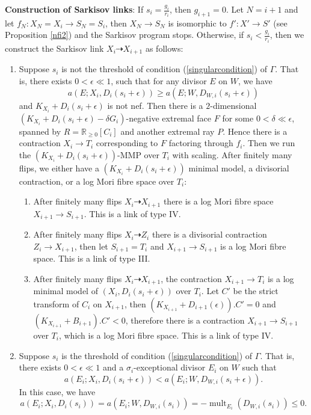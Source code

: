 \documentclass[11pt]{amsart}
\begin{document}
\textbf{Construction of Sarkisov links}\label{Construction}: If $s_{i}=\frac{g_{i}}{r_{i}}$, then $g_{i+1}=0$. Let $N=i+1$  and let $f_{N}:X_{N}=X_{i} \to S_{N}=S_{i}$, then $X_{N}\to S_{N}$ is isomorphic to $f':X'\to S'$ (see Proposition \ref{nfi2}) and  the Sarkisov program stops. Otherwise, if  $s_{i}<\frac{g_{i}}{r_{i}}$, then we construct the Sarkisov link $X_{i}\dashrightarrow X_{i+1}$ as follows:
\begin{enumerate}
  \item\label{2a} Suppose $s_{i}$ is not the threshold of  condition (\ref{singularcondition}) of $\Gamma$. That is, there exists $0<\epsilon\ll 1$, such that for any divisor $E$ on $W$, we have
    \[
      a(E;X_{i},D_{i}(s_{i}+\epsilon))\geqslant a(E;W,D_{W,i}(s_{i}+\epsilon))
    \]
    and $K_{X_{i}}+D_{i}(s_{i}+\epsilon)$ is not nef. Then there is a $2$-dimensional $(K_{X_{i}}+D_{i}(s_{i}+\epsilon)-\delta G_{i})$-negative extremal face $F$ for some $0< \delta \ll \epsilon $, spanned by $R=\mathbb{R}_{\geqslant 0}[C_{i}]$ and another extremal ray $P$. Hence there is a contraction $X_{i}\to T_{i}$ corresponding to $F$ factoring through $f_{i}$. Then we run the $(K_{X_{i}}+D_{i}(s_{i}+\epsilon))$-MMP over $T_{i}$ with scaling. After finitely many flips, we either have a $(K_{X_{i}}+D_{i}(s_{i}+\epsilon))$ minimal model, a divisorial contraction, or a log Mori fibre space over $T_{i}$: 
    \begin{enumerate}
    \item\label{2a1}After finitely many flips $X_{i}\dashrightarrow X_{i+1}$ there is a log Mori fibre space $X_{i+1}\to S_{i+1}$. This is a link of type IV.
    \item\label{2a2} After finitely many flips $X_{i}\dashrightarrow Z_{i}$ there is a divisorial contraction $Z_{i}\to X_{i+1}$, then let $S_{i+1}=T_{i}$ and $X_{i+1}\to S_{i+1}$ is a log Mori fibre space. This is a link of type III.
    \item \label{2a3}After finitely many flips $X_{i}\dashrightarrow X_{i+1}$,  the contraction $X_{i+1}\to T_{i}$ is a log minimal model of $\left(X_{i},D_{i}\left(s_{i}+\epsilon\right)\right)$ over $T_{i}$. Let  $C'$ be the strict transform of  $C_{i}$ on $X_{i+1}$, then $(K_{X_{i+1}}+D_{i+1}(\epsilon)).C'=0$ and $(K_{X_{i+1}}+B_{i+1}).C'<0$, therefore there is a contraction  $X_{i+1} \to S_{i+1}$ over $T_i$, which is a log Mori fibre space. This is a link of type IV. 
  \end{enumerate}
\item\label{2b} Suppose $s_{i}$ is the threshold of condition (\ref{singularcondition}) of $\Gamma$. That is, there exists  $0<\epsilon \ll 1$ and a $\sigma_{i}$-exceptional divisor $E_{i}$ on $W$ such that 
    \[
      a(E_{i};X_{i},D_{i}(s_{i}+\epsilon))< a(E_{i};W,D_{W,i}(s_{i}+\epsilon))
    .\]
   In this case, we have 
    \[
  a(E_{i};X_{i},D_{i}(s_{i}))= a(E_{i};W,D_{W,i}(s_{i}))=-\operatorname{mult}_{E_{i}}(D_{W,i}(s_{i}))\leqslant 0
    .\]


\end{enumerate}
\end{document}
